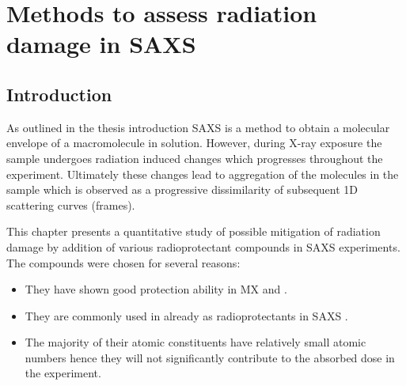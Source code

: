 \chapter{Methods to assess radiation damage in SAXS}
\label{chap:Methods to assess radiation damage in SAXS}

\section{Introduction}
\label{sec:Introduction - SAXS}
 As outlined in the thesis introduction SAXS is a method to obtain a molecular envelope of a macromolecule in solution.
 However, during X-ray exposure the sample undergoes radiation induced changes which progresses throughout the experiment.
 Ultimately these changes lead to aggregation of the molecules in the sample which is observed as a progressive dissimilarity of subsequent 1D scattering curves (frames).

 This chapter presents a quantitative study of possible mitigation of radiation damage by addition of various radioprotectant compounds in SAXS experiments. The compounds were chosen for several reasons:
 \begin{itemize}
     \item They have shown good protection ability in MX \cite{allan2012} and \cite{southworth2007radioprotectant}.
     \item They are commonly used in already as radioprotectants in SAXS \cite{grishaev2012sample}.
     \item The majority of their atomic constituents have relatively small atomic numbers hence they will not significantly contribute to the absorbed dose in the experiment.
 \end{itemize}
